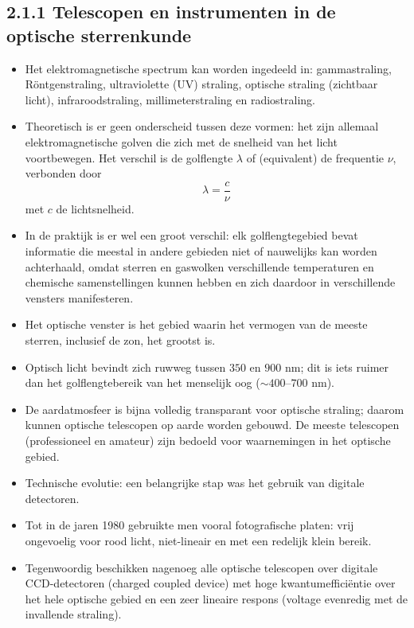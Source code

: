\documentclass[10pt,a4paper]{article}
\renewenvironment{equation}{\begin{equation*}}{\end{equation*}}
\begin{document}
\subsection*{2.1.1 Telescopen en instrumenten in de optische sterrenkunde}
\begin{itemize}
  \item Het elektromagnetische spectrum kan worden ingedeeld in: gammastraling, R\"ontgenstraling, ultraviolette (UV) straling, optische straling (zichtbaar licht), infraroodstraling, millimeterstraling en radiostraling.
  \item Theoretisch is er geen onderscheid tussen deze vormen: het zijn allemaal elektromagnetische golven die zich met de snelheid van het licht voortbewegen. Het verschil is de golflengte $\lambda$ of (equivalent) de frequentie $\nu$, verbonden door
  \begin{equation}
    \lambda = \frac{c}{\nu}
    \tag{2.1}
  \end{equation}
  met $c$ de lichtsnelheid.
  \item In de praktijk is er wel een groot verschil: elk golflengtegebied bevat informatie die meestal in andere gebieden niet of nauwelijks kan worden achterhaald, omdat sterren en gaswolken verschillende temperaturen en chemische samenstellingen kunnen hebben en zich daardoor in verschillende vensters manifesteren.
  \item Het optische venster is het gebied waarin het vermogen van de meeste sterren, inclusief de zon, het grootst is.
  \item Optisch licht bevindt zich ruwweg tussen $350$ en $900$ nm; dit is iets ruimer dan het golflengtebereik van het menselijk oog ($\sim 400$--$700$ nm).
  \item De aardatmosfeer is bijna volledig transparant voor optische straling; daarom kunnen optische telescopen op aarde worden gebouwd. De meeste telescopen (professioneel en amateur) zijn bedoeld voor waarnemingen in het optische gebied.
  \item Technische evolutie: een belangrijke stap was het gebruik van digitale detectoren.
  \item Tot in de jaren 1980 gebruikte men vooral fotografische platen: vrij ongevoelig voor rood licht, niet-lineair en met een redelijk klein bereik.
  \item Tegenwoordig beschikken nagenoeg alle optische telescopen over digitale CCD-detectoren (charged coupled device) met hoge kwantumeffici\"entie over het hele optische gebied en een zeer lineaire respons (voltage evenredig met de invallende straling).

\end{itemize}
\end{document}
